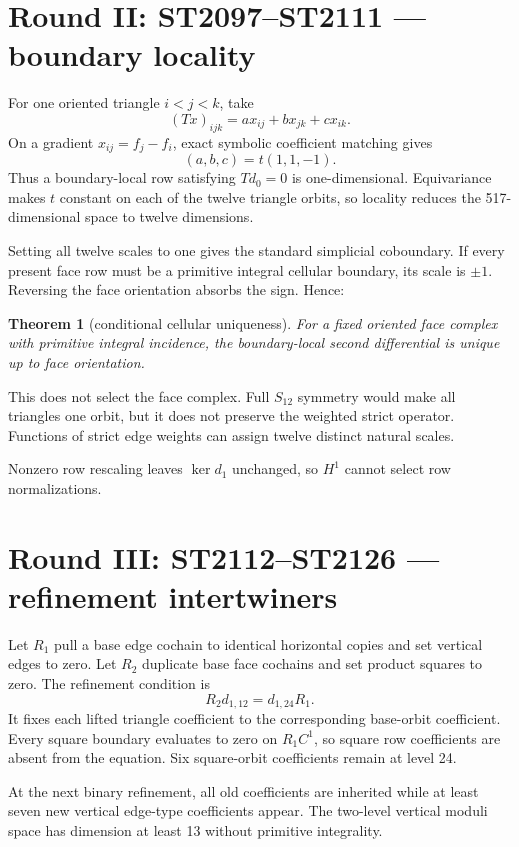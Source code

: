 \documentclass[11pt,a4paper]{article}
\newtheorem{theorem}{Theorem}\newcommand{\status}[1]{\textsf{[#1]}}
\begin{document}
\section{Round II: ST2097--ST2111 --- boundary locality}

For one oriented triangle $i<j<k$, take
\[
(Tx)_{ijk}=a x_{ij}+b x_{jk}+c x_{ik}.
\]
On a gradient $x_{ij}=f_j-f_i$, exact symbolic coefficient matching gives
\[
(a,b,c)=t(1,1,-1).
\]
Thus a boundary-local row satisfying $Td_0=0$ is one-dimensional.  Equivariance
makes $t$ constant on each of the twelve triangle orbits, so locality reduces
the 517-dimensional space to twelve dimensions.

Setting all twelve scales to one gives the standard simplicial coboundary.
If every present face row must be a primitive integral cellular boundary, its
scale is $\pm1$.  Reversing the face orientation absorbs the sign.  Hence:

\begin{theorem}[conditional cellular uniqueness]
For a fixed oriented face complex with primitive integral incidence, the
boundary-local second differential is unique up to face orientation.
\end{theorem}

This does not select the face complex.  Full $S_{12}$ symmetry would make all
triangles one orbit, but it does not preserve the weighted strict operator.
Functions of strict edge weights can assign twelve distinct natural scales.

Nonzero row rescaling leaves $\ker d_1$ unchanged, so $H^1$ cannot select row
normalizations.

\section{Round III: ST2112--ST2126 --- refinement intertwiners}

Let $R_1$ pull a base edge cochain to identical horizontal copies and set
vertical edges to zero.  Let $R_2$ duplicate base face cochains and set product
squares to zero.  The refinement condition is
\[
R_2d_{1,12}=d_{1,24}R_1.
\]
It fixes each lifted triangle coefficient to the corresponding base-orbit
coefficient.  Every square boundary evaluates to zero on $R_1C^1$, so square
row coefficients are absent from the equation.  Six square-orbit coefficients
remain at level 24.

At the next binary refinement, all old coefficients are inherited while at
least seven new vertical edge-type coefficients appear.  The two-level vertical
moduli space has dimension at least 13 without primitive integrality.
\end{document}
